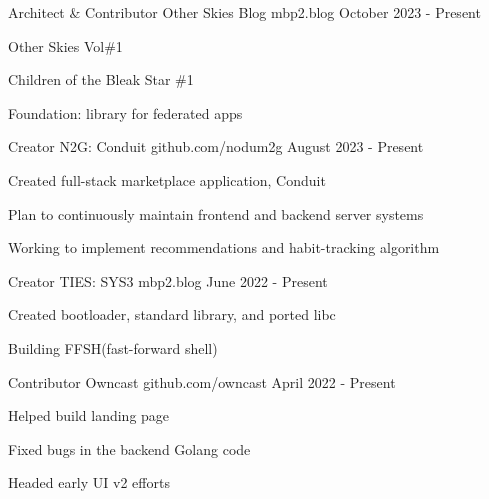 
\begin{cventries}
   \cventry
   {Architect \& Contributor} %
   {Other Skies Blog} %
   {mbp2.blog} %
   {October 2023 - Present} %
   {
      \begin{cvitems} %
         \item {Other Skies Vol\#1}
         \item {Children of the Bleak Star \#1}
         \item {Foundation: library for federated apps}
      \end{cvitems}
   }

   \cventry
   {Creator} %
   {N2G: Conduit} %
   {github.com/nodum2g} %
   {August 2023 - Present} %
   {
      \begin{cvitems} %
         \item {Created full-stack marketplace application, Conduit}
         \item {Plan to continuously maintain frontend and backend server systems}
         \item {Working to implement recommendations and habit-tracking algorithm}
      \end{cvitems}
   }

   \cventry
   {Creator} %
   {TIES: SYS3} %
   {mbp2.blog} %
   {June 2022 - Present} %
   {
      \begin{cvitems} %
         \item {Created bootloader, standard library, and ported libc}
         \item {Building FFSH(fast-forward shell)}
      \end{cvitems}
   }

   \cventry
   {Contributor} %
   {Owncast} %
   {github.com/owncast} %
   {April 2022 - Present} %
   {
      \begin{cvitems} %
         \item {Helped build landing page}
         \item {Fixed bugs in the backend Golang code}
         \item {Headed early UI v2 efforts}
      \end{cvitems}
   }


\end{cventries}
